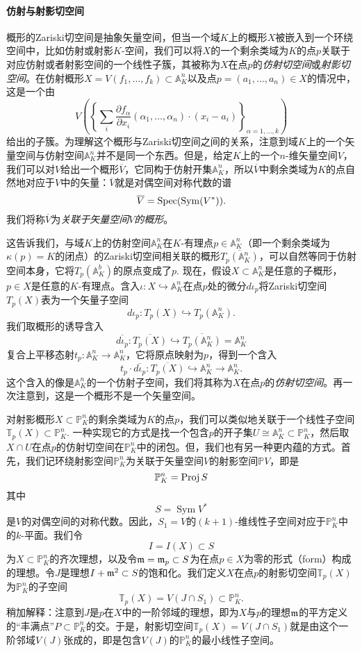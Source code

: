 \paragraph*{仿射与射影切空间}
概形的Zariski切空间是抽象矢量空间，但当一个域$K$上的概形$X$被嵌入到一个环绕空间中，比如仿射或射影$K$-空间，我们可以将$X$的一个剩余类域为$K$的点$p$关联于对应仿射或者射影空间的一个线性子簇，其被称为$X$在点$p$的\textit{仿射切空间}或\textit{射影切空间}。在仿射概形$X=V(f_1,\dots,f_k)\subset \mathbb A_K^n$以及点$p=(a_1,\dots,a_n)\in X$的情况中，这是一个由
\[
	V\left(\left\{
		\sum_i \frac{\partial f_\alpha}{\partial x_i}(\alpha_1,\dots,\alpha_n)\cdot (x_i-a_i)
	\right\}_{\alpha=1,\dots,k}
	\right)
\]
给出的子簇。为理解这个概形与Zariski切空间之间的关系，注意到域$K$上的一个矢量空间与仿射空间$\mathbb A_K^n$并不是同一个东西。但是，给定$K$上的一个$n$-维矢量空间$V$，我们可以对$V$给出一个概形$\overline{V}$，它同构于仿射开集$\mathbb A_K^n$，所以$\overline{V}$中剩余类域为$K$的点自然地对应于$V$中的矢量：$\overline{V}$就是对偶空间对称代数的谱
\[
	\overline{V}=\operatorname{Spec} (\operatorname{Sym}(V^*)).
\]
我们将称$\overline{V}$为\textit{关联于矢量空间$V$的概形}。

这告诉我们，与域$K$上的仿射空间$\mathbb A_K^n$在$K$-有理点$p\in \mathbb A^n_K$（即一个剩余类域为$\kappa(p)=K$的闭点）的Zariski切空间相关联的概形$\overline{T_p(\mathbb A^n_K)}$，可以自然等同于仿射空间本身，它将$T_p(\mathbb A_K^b)$的原点变成了$p$. 现在，假设$X\subset \mathbb A_K^n$是任意的子概形，$p\in X$是任意的$K$-有理点。含入$\iota:X\hookrightarrow \mathbb A_K^n$在点$p$处的微分$d\iota_p$将Zariski切空间$T_p(X)$表为一个矢量子空间
\[
	d\iota_p:T_p(X)\hookrightarrow T_p(\mathbb A_K^n).
\]
我们取概形的诱导含入
\[
	\overline{d\iota_p}:\overline{T_p(X)}\hookrightarrow
	\overline{T_p(\mathbb A_K^n)}=\mathbb A_K^n
\]
复合上平移态射$t_p:\mathbb A^n_K\to \mathbb A^n_K$，它将原点映射为$p$，得到一个含入
\[
	t_p\cdot \overline{d\iota_p}:\overline{T_p(X)}\hookrightarrow
	\mathbb A_K^n \longrightarrow \mathbb A_K^n.
\]
这个含入的像是$\mathbb A_K^n$的一个仿射子空间，我们将其称为$X$在点$p$的\textit{仿射切空间}。再一次注意到，这是一个概形不是一个矢量空间。

对射影概形$X\subset \mathbb P_K^n$的剩余类域为$K$的点$p$，我们可以类似地关联于一个线性子空间$\mathbb T_p(X)\subset \mathbb P_K^n$. 一种实现它的方式是找一个包含$p$的开子集$U\cong \mathbb A_K^n\subset \mathbb P^n_K$，然后取$X\cap U$在点$p$的仿射切空间在$\mathbb P_K^n$中的闭包。但，我们也有另一种更内蕴的方式。首先，我们记环绕射影空间$\mathbb P_K^n$为关联于矢量空间$V$的射影空间$\mathbb PV$，即是
\[
	\mathbb P_K^n=\operatorname{Proj} S
\]
其中
\[
	S=\operatorname{Sym}V^*
\]
是$V$的对偶空间的对称代数。因此，$S_1=V$的$(k+1)$-维线性子空间对应于$\mathbb P_K^n$中的$k$-平面。我们令
\[
	I=I(X)\subset S
\]
为$X\subset \mathbb P_K^n$的齐次理想，以及令$\mathfrak{m}=\mathfrak{m}_p\subset S$为在点$p\in X$为零的形式（form）构成的理想。令$J$是理想$I+\mathfrak{m}^2\subset S$的饱和化。我们定义$X$在点$p$的射影切空间$\mathbb T_p(X)$为$\mathbb P_K^n$的子空间
\[
	\mathbb T_p (X)=V(J\cap S_1)\subset \mathbb P^n_K.
\]
稍加解释：注意到$J$是$p$在$X$中的一阶邻域的理想，即为$X$与$p$的理想$\mathfrak{m}$的平方定义的“丰满点”$P\subset \mathbb P_K^n$的交。于是，射影切空间$\mathbb T_p(X)=V(J\cap S_1)$就是由这个一阶邻域$V(J)$张成的，即是包含$V(J)$的$\mathbb P_K^n$的最小线性子空间。

